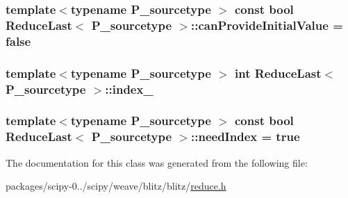 \subsubsection[{can\+Provide\+Initial\+Value}]{\setlength{\rightskip}{0pt plus 5cm}template$<$typename P\+\_\+sourcetype $>$ const {\bf bool} {\bf Reduce\+Last}$<$ P\+\_\+sourcetype $>$\+::can\+Provide\+Initial\+Value = {\bf false}\hspace{0.3cm}{\ttfamily [static]}}\label{classReduceLast_a928dc9a31d650756f02af09fc83b6189}
\hypertarget{classReduceLast_a3e6043bceb1cee5afc7a48b874139018}{}
\subsubsection[{index\+\_\+}]{\setlength{\rightskip}{0pt plus 5cm}template$<$typename P\+\_\+sourcetype $>$ int {\bf Reduce\+Last}$<$ P\+\_\+sourcetype $>$\+::index\+\_\+\hspace{0.3cm}{\ttfamily [protected]}}\label{classReduceLast_a3e6043bceb1cee5afc7a48b874139018}
\hypertarget{classReduceLast_acb74691ed54238b159e787f230abda16}{}
\subsubsection[{need\+Index}]{\setlength{\rightskip}{0pt plus 5cm}template$<$typename P\+\_\+sourcetype $>$ const {\bf bool} {\bf Reduce\+Last}$<$ P\+\_\+sourcetype $>$\+::need\+Index = {\bf true}\hspace{0.3cm}{\ttfamily [static]}}\label{classReduceLast_acb74691ed54238b159e787f230abda16}


The documentation for this class was generated from the following file\+:\begin{DoxyCompactItemize}
\item 
packages/scipy-\/0../scipy/weave/blitz/blitz/\hyperlink{reduce_8h}{reduce.\+h}\end{DoxyCompactItemize}
